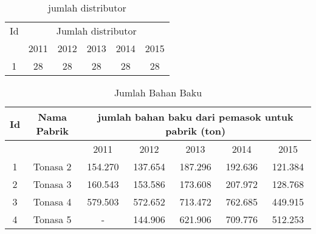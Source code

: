 \documentclass{article}
\begin{document}
\begin{table}[h]
	\caption{jumlah distributor}
	\begin{tabular}{|c|ccccc|}
		\hline
		\multicolumn{ 1}{|c|}{Id} &                       \multicolumn{ 5}{|c}{Jumlah distributor} \\
		
		\multicolumn{ 1}{|c|}{} &       2011 &       2012 &       2013 &       2014 &       2015 \\
		\hline
		1 &         28 &         28 &         28 &         28 &         28 \\
		\hline
	\end{tabular}  
	
\end{table}

\begin{table}[h]
	\caption{Jumlah Bahan Baku}
	\begin{tabular}{|c|c|c|c|c|c|c|}
		\hline
		\multicolumn{ 1}{|c|}{Id} & \multicolumn{ 1}{|c|}{Nama Pabrik} & \multicolumn{ 5}{|c|}{jumlah bahan baku dari pemasok untuk pabrik (ton)} \\
		\hline
		\multicolumn{ 1}{|c|}{} & \multicolumn{ 1}{|c|}{} &       2011 &       2012 &       2013 &       2014 &       2015 \\
		\hline
		1 &   Tonasa 2 &    154.270 &    137.654 &    187.296 &    192.636 &    121.384 \\
		\hline
		2 &   Tonasa 3 &    160.543 &    153.586 &    173.608 &    207.972 &    128.768 \\
		\hline
		3 &   Tonasa 4 &    579.503 &    572.652 &    713.472 &    762.685 &    449.915 \\
		\hline
		4 &   Tonasa 5 &          - &    144.906 &    621.906 &    709.776 &    512.253 \\
		\hline
	\end{tabular}  
\end{table}
\end{document}
